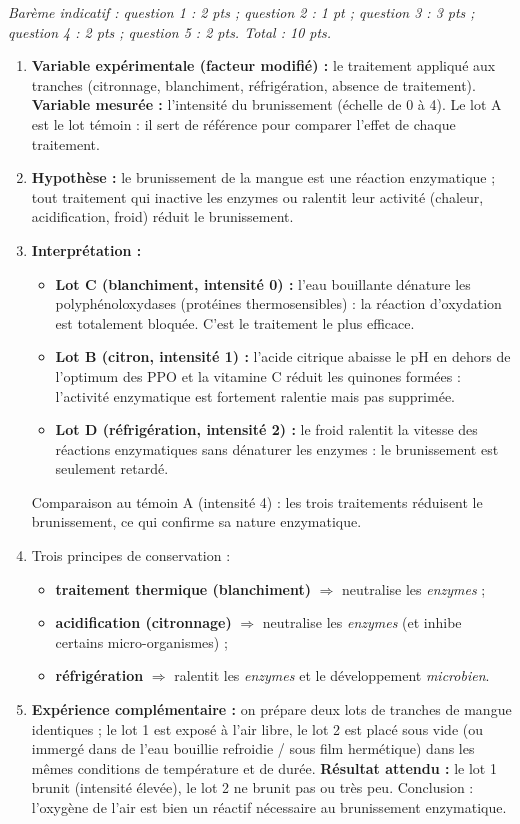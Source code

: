 \documentclass[11pt]{article}
\newcommand{\cle}[1]{{\popxbold\color{popdark}#1}}
\begin{document}
\begin{corrige}
\emph{Barème indicatif : question 1 : 2 pts ; question 2 : 1 pt ; question 3 : 3 pts ; question 4 : 2 pts ; question 5 : 2 pts. Total : 10 pts.}
\begin{enumerate}
\item \textbf{Variable expérimentale (facteur modifié) :} le traitement appliqué aux tranches (citronnage, blanchiment, réfrigération, absence de traitement). \textbf{Variable mesurée :} l'intensité du brunissement (échelle de 0 à 4). Le lot A est le \cle{lot témoin} : il sert de référence pour comparer l'effet de chaque traitement.
\item \textbf{Hypothèse :} le brunissement de la mangue est une réaction enzymatique ; tout traitement qui inactive les enzymes ou ralentit leur activité (chaleur, acidification, froid) réduit le brunissement.
\item \textbf{Interprétation :}
\begin{itemize}
\item \textbf{Lot C (blanchiment, intensité 0) :} l'eau bouillante dénature les polyphénoloxydases (protéines thermosensibles) : la réaction d'oxydation est totalement bloquée. C'est le traitement le plus efficace.
\item \textbf{Lot B (citron, intensité 1) :} l'acide citrique abaisse le pH en dehors de l'optimum des PPO et la vitamine C réduit les quinones formées : l'activité enzymatique est fortement ralentie mais pas supprimée.
\item \textbf{Lot D (réfrigération, intensité 2) :} le froid ralentit la vitesse des réactions enzymatiques sans dénaturer les enzymes : le brunissement est seulement retardé.
\end{itemize}
Comparaison au témoin A (intensité 4) : les trois traitements réduisent le brunissement, ce qui confirme sa nature enzymatique.
\item Trois principes de conservation :
\begin{itemize}
\item \textbf{traitement thermique (blanchiment)} $\Rightarrow$ neutralise les \emph{enzymes} ;
\item \textbf{acidification (citronnage)} $\Rightarrow$ neutralise les \emph{enzymes} (et inhibe certains micro-organismes) ;
\item \textbf{réfrigération} $\Rightarrow$ ralentit les \emph{enzymes} et le développement \emph{microbien}.
\end{itemize}
\item \textbf{Expérience complémentaire :} on prépare deux lots de tranches de mangue identiques ; le lot 1 est exposé à l'air libre, le lot 2 est placé sous vide (ou immergé dans de l'eau bouillie refroidie / sous film hermétique) dans les mêmes conditions de température et de durée. \textbf{Résultat attendu :} le lot 1 brunit (intensité élevée), le lot 2 ne brunit pas ou très peu. Conclusion : l'oxygène de l'air est bien un réactif nécessaire au brunissement enzymatique.
\end{enumerate}
\end{corrige}
\end{document}
